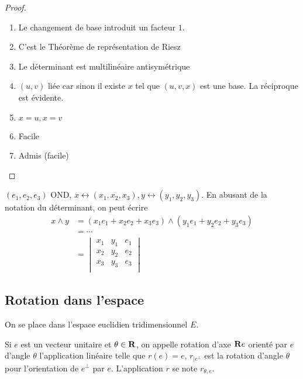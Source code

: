 \begin{proof}
    \begin{enumerate}
        \item Le changement de base introduit un facteur $1$.
        \item C'est le Théorème de représentation de Riesz
        \item Le déterminant est multilinéaire antisymétrique
        \item $(u,v)$ liée car sinon il existe $x$ tel que $(u,v,x)$ est une base. La réciproque est évidente.
        \item $x=u, x=v$
        \item Facile
        \item Admis (facile)
    \end{enumerate}
\end{proof}

\begin{rem}
    $(e_1, e_2, e_3)$ OND, $x \leftrightarrow (x_1, x_2, x_3), y\leftrightarrow (y_1, y_2, y_3)$. En abusant de la notation du déterminant, on peut écrire \begin{align*}
        x\wedge y &= (x_1e_1+x_2e_2+x_3e_3)\wedge (y_1e_1+y_2e_2+y_3e_3) \\
        &= \cdots \\
        &= \begin{vmatrix}
            x_1 & y_1 & e_1 \\
            x_2 & y_2 & e_2 \\
            x_3 & y_3 & e_3 \\
        \end{vmatrix}
    \end{align*}
\end{rem}

\subsection{Rotation dans l'espace}

On se place dans l'espace euclidien tridimensionnel $E$.

\begin{dfn}
    Si $e$ est un vecteur unitaire et $\theta \in \mathbf R$, on appelle rotation d'axe $\mathbf R e$ orienté par $e$ d'angle $\theta$ l'application linéaire telle que $r(e)=e$, $r_{|e^\bot}$ est la rotation d'angle $\theta$ pour l'orientation de $e^\bot$ par $e$. L'application $r$ se note $r_{\theta, e}$.
\end{dfn}

